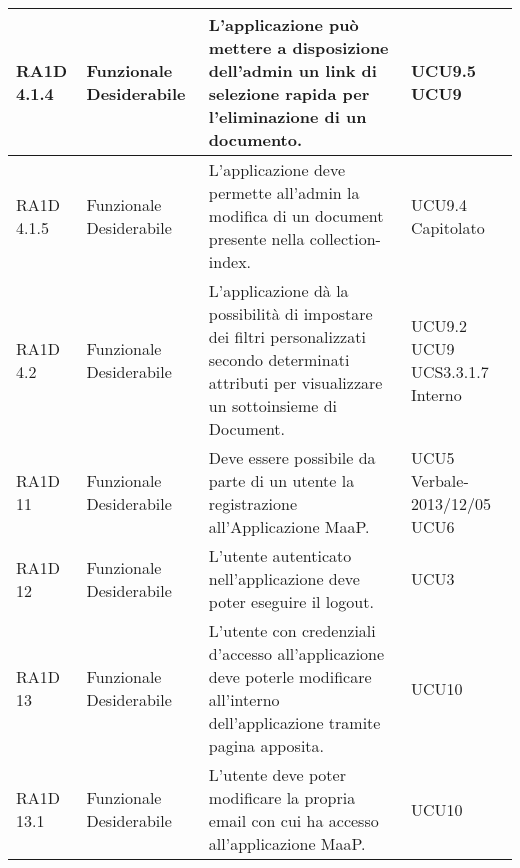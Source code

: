 \begin{center}
\begin{longtable}{ | l | p{2cm} | p{5cm} | p{1.7cm} |}
        RA1D 4.1.4  & Funzionale \newline  Desiderabile  & L'applicazione può mettere a disposizione dell'admin un link di selezione rapida per l'eliminazione di un documento.
 &  UCU9.5 \newline  UCU9 \newline  \\ \hline      
        RA1D 4.1.5 & Funzionale \newline  Desiderabile  & L'applicazione deve permette all'admin la modifica di un document presente nella collection-index. &  UCU9.4 \newline  Capitolato \newline  \\ \hline      
        RA1D 4.2  & Funzionale \newline  Desiderabile  & L'applicazione dà la possibilità di impostare dei filtri personalizzati secondo determinati attributi per visualizzare un sottoinsieme di Document. &  UCU9.2 \newline  UCU9 \newline  UCS3.3.1.7 \newline  Interno \newline  \\ \hline      
        RA1D 11 & Funzionale \newline  Desiderabile  & Deve essere possibile da parte di un utente la registrazione all'Applicazione MaaP. &  UCU5 \newline  Verbale-2013/12/05 \newline  UCU6 \newline  \\ \hline      
        RA1D 12 & Funzionale \newline  Desiderabile  & L'utente autenticato nell'applicazione deve poter eseguire il logout.  &  UCU3 \newline  \\ \hline      
        RA1D 13 & Funzionale \newline  Desiderabile  & L'utente con credenziali d'accesso all'applicazione deve poterle modificare all'interno dell'applicazione tramite pagina apposita. &  UCU10 \newline  \\ \hline      
        RA1D 13.1 & Funzionale \newline  Desiderabile  & L'utente deve poter modificare la propria email con cui ha accesso all'applicazione MaaP. &  UCU10 \newline  \\ \hline      

\end{longtable}
\end{center}
